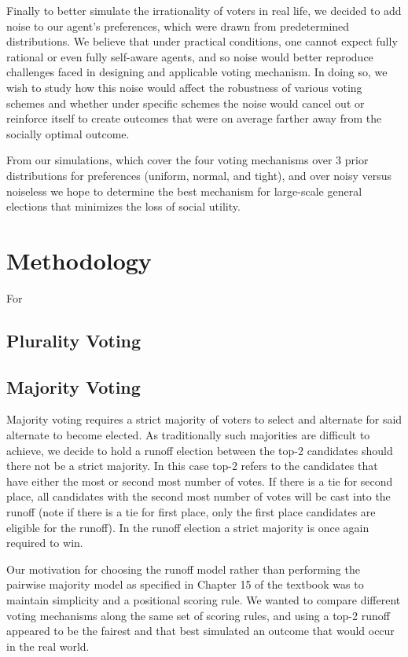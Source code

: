 \documentclass[11pt]{article}
\begin{document}
Finally to better simulate the irrationality of voters in real life, we decided to add noise to our agent's preferences, which were drawn from predetermined distributions. We believe that under practical conditions, one cannot expect fully rational or even fully self-aware agents, and so noise would better reproduce challenges faced in designing and applicable voting mechanism. In doing so, we wish to study how this noise would affect the robustness of various voting schemes and whether under specific schemes the noise would cancel out or reinforce itself to create outcomes that were on average farther away from the socially optimal outcome.

From our simulations, which cover the four voting mechanisms over 3 prior distributions for preferences (uniform, normal, and tight), and over noisy versus noiseless we hope to determine the best mechanism for large-scale general elections that minimizes the loss of social utility.

\section*{Methodology}

For 
\subsection*{Plurality Voting}
\subsection*{Majority Voting}

Majority voting requires a strict majority of voters to select and alternate for said alternate to become elected. As traditionally such majorities are difficult to achieve, we decide to hold a runoff election between the top-2 candidates should there not be a strict majority. In this case top-2 refers to the candidates that have either the most or second most number of votes. If there is a tie for second place, all candidates with the second most number of votes will be cast into the runoff (note if there is a tie for first place, only the first place candidates are eligible for the runoff). In the runoff election a strict majority is once again required to win.

Our motivation for choosing the runoff model rather than performing the pairwise majority model as specified in Chapter 15 of the textbook was to maintain simplicity and a positional scoring rule. We wanted to compare different voting mechanisms along the same set of scoring rules, and using a top-2 runoff appeared to be the fairest and that best simulated an outcome that would occur in the real world.
\end{document}
